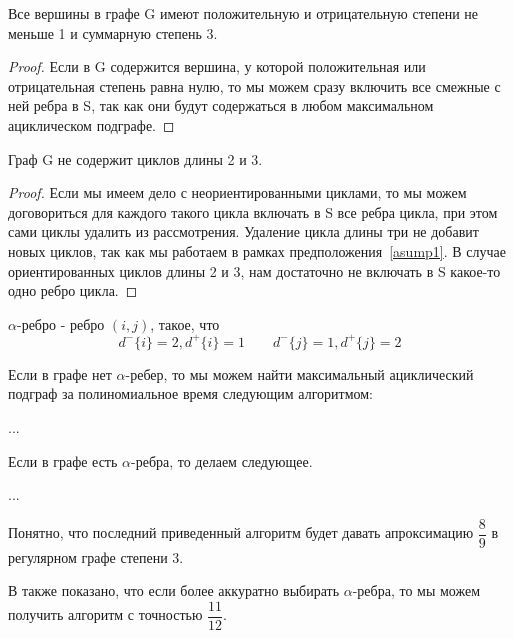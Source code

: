 \begin{assumption}\label{asump1}
    Все вершины в графе G имеют положительную и отрицательную степени не меньше
    1 и суммарную степень 3.
\end{assumption}

\begin{proof}
    Если в G содержится вершина, у которой положительная или отрицательная
    степень равна нулю, то мы можем сразу включить все смежные с ней ребра 
    в S, так как они будут содержаться в любом максимальном ациклическом
    подграфе.
\end{proof}

\begin{assumption}
    Граф G не содержит циклов длины 2 и 3.
\end{assumption}

\begin{proof}
    Если мы имеем дело с неориентированными циклами, то мы можем договориться
    для каждого такого цикла включать в S все ребра цикла, при этом
    сами циклы удалить из рассмотрения. Удаление цикла длины три не добавит
    новых циклов, так как мы работаем в рамках предположения~\ref{asump1}.
    В случае ориентированных циклов длины 2 и 3, нам достаточно не включать в S 
    какое-то одно ребро цикла.
\end{proof}

\begin{definition}
    $\alpha$-ребро - ребро $(i,j)$, такое, что 
    $$d^-\{i\} = 2, d^+\{i\}=1 \qquad d^-\{j\} = 1, d^+\{j\}=2$$
\end{definition}

Если в графе нет $\alpha$-ребер, то мы можем найти максимальный ациклический 
подграф за полиномиальное время следующим алгоритмом:

...

Если в графе есть $\alpha$-ребра, то делаем следующее.

...

Понятно, что последний приведенный алгоритм будет давать апроксимацию 
$\dfrac{8}{9}$ в регулярном графе степени 3.

В \cite{digraph_3} также показано, что если более аккуратно выбирать 
$\alpha$-ребра, то мы можем получить алгоритм с точностью $\dfrac{11}{12}$.

